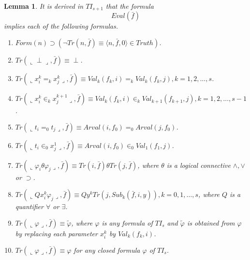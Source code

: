 \documentclass{asl}
\newtheorem{lemma}{Lemma}[section]
\theoremstyle{definition}
\begin{document}
\begin{lemma}
It is derived in $TI_{s+1}$ that the formula 
\[Eval(\bar{f})\] 
implies each of the following formulas.
\begin{enumerate}
\item $Form(n)\supset 
\left( \neg Tr(n,\bar{f})\equiv \langle n,\bar{f},0 \rangle \in Truth\right) $.
\item $Tr(\llcorner \perp \lrcorner,\bar{f})\equiv \perp$.
\medskip
\item 
$Tr(\llcorner x_i^k=_k x_j^k \lrcorner,\bar{f}) \equiv Val_k(f_k,i)=_k Val_k(f_k,j),k=1,2,\ldots,s$.
\medskip
\item $Tr(\llcorner x_i^k\in_k x_j^{k+1} \lrcorner, \bar{f})\equiv Val_k(f_k,i)\in_k Val_{k+1}(f_{k+1},j),k=1,2,\ldots,s-1$.
\medskip
\item $Tr(\llcorner t_i=_0 t_j \lrcorner,\bar{f}) \equiv Arval(i,f_0)=_0 Arval(j,f_0)$.
\medskip
\item $Tr(\llcorner t_i\in_0 x_j^1 \lrcorner, \bar{f})\equiv Arval(i,f_0)\in_0 Val_1(f_1,j)$.
\medskip
\item $Tr(\llcorner \varphi_i \theta \varphi_j \lrcorner,\bar{f}) \equiv Tr(i,\bar{f}) \theta Tr(j,\bar{f})$, where $\theta$ is a logical connective $\wedge,\vee$ or $\supset$.
\medskip
\item $Tr(\llcorner Qx^k_i \varphi_j \lrcorner,\bar{f}) \equiv Qy^kTr(j,Sub_k(\bar{f},i,y)),k=0,1,\ldots,s$, where $Q$ is a quantifier $\forall$ or $\exists$.
\medskip
\item $Tr(\llcorner \varphi\lrcorner, \bar{f})\equiv \tilde{\varphi}$, where $\varphi$ is any formula of $TI_s$ and $\tilde{\varphi}$ is obtained from $\varphi$ by replacing each parameter $x_i^k$ by $Val_k(f_k,i)$.
\medskip
\item $Tr(\llcorner \varphi\lrcorner, \bar{f})\equiv \varphi$ for any closed formula $\varphi$ of $TI_s$.
\end{enumerate}
\label{lemma:trset11}
\end{lemma}
\end{document}
